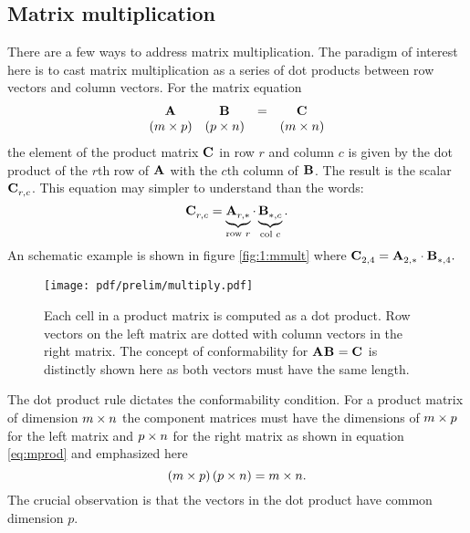 \subsection{Matrix multiplication}
There are a few ways to address matrix multiplication. The paradigm of interest here is to cast matrix multiplication as a series of dot products between row vectors and column vectors. For the matrix equation
\begin{equation}
  \begin{array}{cccc}
  \textbf{A}^{\mathrm{}}&\textbf{B}^{\mathrm{}} &=& \textbf{C}^{\mathrm{}}\\
  \left( m \times p \right) & \left( p \times n \right) && \left( m \times n \right)
  \end{array}
  \label{eq:mprod}
\end{equation}
the element of the product matrix $\textbf{C}^{\mathrm{}}$ in row $r$ and column $c$ is given by the dot product of the $r$th row of $\textbf{A}^{\mathrm{}}$ with the $c$th column of $\textbf{B}^{\mathrm{}}$. The result is the scalar $\textbf{C}^{\mathrm{}}_{r,c}$. This equation may simpler to understand than the words:
\begin{equation}
  \textbf{C}^{\mathrm{}}_{r,c} = \underbrace{\textbf{A}^{\mathrm{}}_{r,*}}_{\text{row }r}\cdot\underbrace{\textbf{B}^{\mathrm{}}_{*,c}}_{\text{col }c}.
  \label{eq:dot}
\end{equation}
An schematic example is shown in figure \eqref{fig:1:mmult} where $\textbf{C}^{\mathrm{}}_{2,4} = \textbf{A}^{\mathrm{}}_{2,*}\cdot\textbf{B}^{\mathrm{}}_{*,4}.$
\begin{figure}[htbp] %
   \centering
   \texttt{[image: pdf/prelim/multiply.pdf]} 
   \caption{Each cell in a product matrix is computed as a dot product. Row vectors on the left matrix are dotted with column vectors in the right matrix. The concept of conformability for $\textbf{A}^{\mathrm{}}\textbf{B}^{\mathrm{}}=\textbf{C}^{\mathrm{}}$ is distinctly shown here as both vectors must have the same length.}
   \label{fig:1:mmult}
\end{figure}
The dot product rule dictates the conformability condition. For a product matrix of dimension $m \times n$ the component matrices must have the dimensions
of $m \times p$ for the left matrix and $p \times n$ for the right matrix as shown in equation \eqref{eq:mprod} and emphasized here
\begin{equation}
\left( m \times p \right)\left( p \times n \right)=m \times n.
\end{equation}
The crucial observation is that the vectors in the dot product have common dimension $p$.

